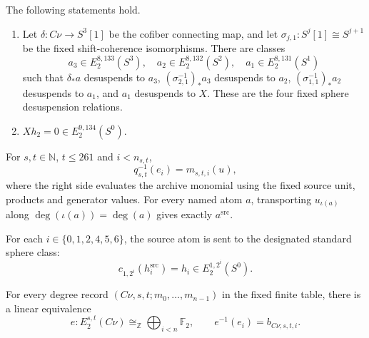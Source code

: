 \begin{theorem}
\label{frontier:E2Computation:fd3a2ddf7954}
The following statements hold.
\begin{enumerate}
\item Let $\delta:C\nu\to S^3[1]$ be the cofiber connecting map, and let $\sigma_{j,1}:S^j[1]\cong S^{j+1}$ be the fixed shift-coherence isomorphisms. There are classes
\[a_3\in E_2^{8,133}(S^3),\quad a_2\in E_2^{8,132}(S^2),\quad a_1\in E_2^{8,131}(S^1)\]
such that $\delta_*a$ desuspends to $a_3$, $(\sigma_{2,1}^{-1})_*a_3$ desuspends to $a_2$, $(\sigma_{1,1}^{-1})_*a_2$ desuspends to $a_1$, and $a_1$ desuspends to $X$. These are the four fixed sphere desuspension relations.
\item $Xh_2=0\in E_2^{9,134}(S^0)$.
\end{enumerate}
\end{theorem}

\begin{theorem}
\label{frontier:E2Computation:d71314d20c81}
For $s,t\in\mathbb N$, $t\leq261$ and $i<n_{s,t}$,
\[q_{s,t}^{-1}(e_i)=m_{s,t,i}(u),\]
where the right side evaluates the archive monomial using the fixed source unit, products and generator values. For every named atom $a$, transporting $u_{\iota(a)}$ along $\deg(\iota(a))=\deg(a)$ gives exactly $a^{\mathrm{src}}$.
\end{theorem}

\begin{theorem}
\label{frontier:E2Computation:d76af9345531}
For each $i\in\{0,1,2,4,5,6\}$, the source atom is sent to the designated standard sphere class:
\[c_{1,2^i}(h_i^{\mathrm{src}})=h_i\in E_2^{1,2^i}(S^0).\]
\end{theorem}

\begin{theorem}
\label{frontier:E2Computation:6e2df2108f8d}
For every degree record $(C\nu,s,t;m_0,\ldots,m_{n-1})$ in the fixed finite table, there is a linear equivalence
\[e:E_2^{s,t}(C\nu)\cong_{\mathbb Z}\bigoplus_{i<n}\mathbb F_2,\qquad e^{-1}(e_i)=b_{C\nu;s,t,i}.\]
\end{theorem}

